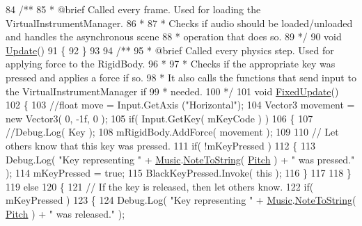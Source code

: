 \begin{DoxyCodeInclude}
84 \textcolor{comment}{    /**}
85 \textcolor{comment}{     * @brief Called every frame. Used for loading the VirtualInstrumentManager.}
86 \textcolor{comment}{     * }
87 \textcolor{comment}{     * Checks if audio should be loaded/unloaded and handles the asynchronous scene}
88 \textcolor{comment}{     * operation that does so.}
89 \textcolor{comment}{     */}
90     \textcolor{keywordtype}{void} \hyperlink{group___black_key_unity_ga24ef6b8b614685c5591868b9b23197ed}{Update}()
91     \{
92     \}
93 \textcolor{comment}{}
94 \textcolor{comment}{    /**}
95 \textcolor{comment}{     * @brief Called every physics step. Used for applying force to the RigidBody.}
96 \textcolor{comment}{     * }
97 \textcolor{comment}{     * Checks if the appropriate key was pressed and applies a force if so.}
98 \textcolor{comment}{     * It also calls the functions that send input to the VirtualInstrumentManager if}
99 \textcolor{comment}{     * needed.}
100 \textcolor{comment}{     */}
101     \textcolor{keywordtype}{void} \hyperlink{group___black_key_unity_gad8926397bba69558f5440eac2c38aff8}{FixedUpdate}()
102     \{
103         \textcolor{comment}{//float move = Input.GetAxis ("Horizontal");}
104         Vector3 movement = \textcolor{keyword}{new} Vector3( 0, -1f, 0 );
105         \textcolor{keywordflow}{if}( Input.GetKey( mKeyCode ) )
106         \{
107             \textcolor{comment}{//Debug.Log( Key );}
108             mRigidBody.AddForce( movement );
109 
110             \textcolor{comment}{// Let others know that this key was pressed.}
111             \textcolor{keywordflow}{if}( !mKeyPressed )
112             \{
113                 Debug.Log( \textcolor{stringliteral}{"Key representing "} + \hyperlink{class_music}{Music}.\hyperlink{group___music_stat_func_ga85a22c905d56d4c5f4e62159bfecee8c}{NoteToString}( 
      \hyperlink{group___black_key_pub_var_gad233c456182c9cef7c01486484940439}{Pitch} ) + \textcolor{stringliteral}{" was pressed."} );
114                 mKeyPressed = \textcolor{keyword}{true};
115                 BlackKeyPressed.Invoke( \textcolor{keyword}{this} );
116             \}
117 
118         \}
119         \textcolor{keywordflow}{else}
120         \{
121             \textcolor{comment}{// If the key is released, then let others know.}
122             \textcolor{keywordflow}{if}( mKeyPressed )
123             \{
124                 Debug.Log( \textcolor{stringliteral}{"Key representing "} + \hyperlink{class_music}{Music}.\hyperlink{group___music_stat_func_ga85a22c905d56d4c5f4e62159bfecee8c}{NoteToString}( 
      \hyperlink{group___black_key_pub_var_gad233c456182c9cef7c01486484940439}{Pitch} ) + \textcolor{stringliteral}{" was released."} );

\end{DoxyCodeInclude}

